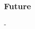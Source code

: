 \documentclass[letterpaper,10pt]{article}
\begin{document}
			\subsubsection{Future}
			
			-
		
%				
%				
%				
%				
%				
%				
	
\end{document}
